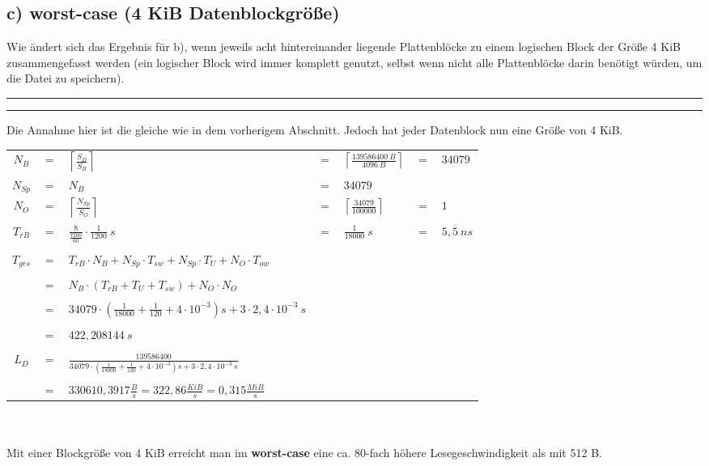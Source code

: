 \documentclass{ti2}
\makeatletter
\renewenvironment{quote}{%
	\vskip 10\p@
	\parindent\z@
	\tcolorbox[
	breakable, sharp corners,
	boxrule=\z@, boxsep=\z@,
	left=\z@, right=\z@,
	top=\z@, bottom=\z@,
	colback=sx-yellow
	]
	{\color{sx-orange}\d@ublerule}
	\vskip 5\p@
	\list{}{\rightmargin\leftmargin}%
	\item\relax
}{%
\endlist
{\color{sx-orange}\d@ublerule}
\endtcolorbox
\vskip 5\p@
}
\def\d@ublerule{\hrule\@width\hsize\kern 1.5\p@\hrule\@width\hsize}
\makeatother
\begin{document}
\subsection*{c) worst-case (4 KiB Datenblockgröße)}
\begin{quote}
Wie ändert sich das Ergebnis für b), wenn jeweils acht hintereinander liegende Plattenblöcke
zu einem logischen Block der Größe 4 KiB zusammengefasst werden (ein logischer Block
wird immer komplett genutzt, selbst wenn nicht alle Plattenblöcke darin benötigt würden,
um die Datei zu speichern).
\end{quote}
Die Annahme hier ist die gleiche wie in dem vorherigem Abschnitt. Jedoch hat jeder Datenblock nun eine Größe von 4 KiB.\\
\begin{tabular}{cclclcl}%
$N_B$ & $=$ & $\left\lceil\frac{S_D}{S_B}\right\rceil$ & $=$ & $\left\lceil\frac{139586400~B}{4096~B}\right\rceil$ & $=$ & $34079$ \\

$N_{Sp}$ & $=$ & $N_B$ & $=$ & $34079$ \\

$N_O$ & $=$ & $\left\lceil\frac{N_{Sp}}{S_O}\right\rceil$ & $=$ & $\left\lceil\frac{34079}{100000}\right\rceil$ & $=$ & $1$ \\

$T_{rB}$ & $=$ & $\frac{8}{\frac{7200}{60}}\cdot\frac{1}{1200}~s$ & $=$ & $\frac{1}{18000}~s$ & $=$ & $5,\overline{5}~ns$ \\\\

$T_{ges}$ & $=$ & $T_{rB} \cdot N_B + N_{Sp}\cdot T_{sw} + N_{Sp} \cdot T_U + N_O \cdot T_{ow}$\\ \\
& $=$ & $N_B\cdot\left(T_{rB} + T_U + T_{sw}\right) + N_O \cdot N_O$\\ \\
& $=$ & $34079\cdot\left(\frac{1}{18000} + \frac{1}{120} + 4 \cdot 10^{-3}\right)s + 3 \cdot 2,4\cdot10^{-3}~s$ \\ \\
& $=$ & $422,208144~s$\\ \\
$L_D$ & $=$ & $\frac{139586400}{34079\cdot\left(\frac{1}{18000} + \frac{1}{120} + 4 \cdot 10^{-3}\right)s + 3 \cdot 2,4\cdot10^{-3}~s}$\\\\
& $=$ & $330610,3917\frac{B}{s}=322,86\frac{KiB}{s}=0,315\frac{MiB}{s}$\\
\end{tabular}\\
\\
Mit einer Blockgröße von 4 KiB erreicht man im \textbf{worst-case} eine ca. 80-fach höhere Lesegeschwindigkeit als mit 512 B.
\newpage
\end{document}
